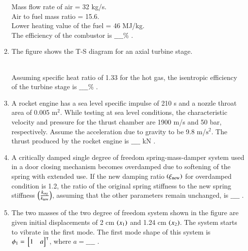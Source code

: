 \documentclass[journal]{IEEEtran}
\begin{document}
\begin{enumerate}
Mass flow rate of air = 32 kg/s. \\
Air to fuel mass ratio = 15.6. \\
Lower heating value of the fuel = 46 MJ/kg. \\
The efficiency of the combustor is $\_\_\_\_$\% . \\
\item The figure shows the T-S diagram for an axial turbine stage.
\begin{figure}[!ht]
\centering
\resizebox{0.5\textwidth}{!}{%

}%
\end{figure}\\
Assuming specific heat ratio of 1.33 for the hot gas, the isentropic efficiency of the turbine stage is $\_\_\_\_$\% . \\
\item A rocket engine has a sea level specific impulse of 210 s and a nozzle throat area of 0.005 $\text{m}^2$. While testing at sea level conditions, the characteristic velocity and pressure for the thrust chamber are 1900 m/s and 50 bar, respectively. Assume the acceleration due to gravity to be 9.8 m/$\text{s}^2$. The thrust produced by the rocket engine is $\_\_\_\_$ kN . \\
\item A critically damped single degree of freedom spring-mass-damper system used in a door closing mechanism becomes overdamped due to softening of the spring with extended use. If the new damping ratio $\left(\xi_{\text{new}}\right)$ for overdamped condition is 1.2, the ratio of the original spring stiffness to the new spring stiffness $\left(\frac{k_{\text{org}}}{k_{\text{new}}}\right)$, assuming that the other parameters remain unchanged, is $\_\_\_\_$ . \\
\item The two masses of the two degree of freedom system shown in the figure are given initial displacements of 2 cm $\left(x_1\right)$ and 1.24 cm $\left(x_2\right)$. The system starts to vibrate in the first mode. The first mode shape of this system is $\phi_1 = {}\left[\begin{matrix}
    1 & a
\end{matrix}\right]^\intercal$, where $a = \_\_\_\_$ . 
\begin{figure}[!ht]
\centering
\resizebox{0.5\textwidth}{!}{%

}
\end{figure}
\end{enumerate}
\end{document}
